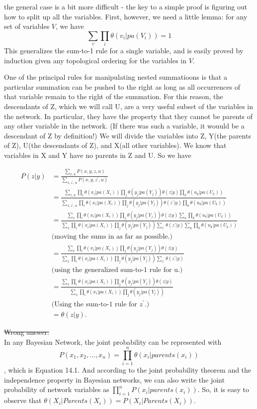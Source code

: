 \documentclass{article}
\begin{document}
\begin{enumerate}[a.]
{the general case is a bit more difficult - the key to a simple proof
is figuring out how to split up all the variables. First, however, we
need a little lemma: for any set of variables $V$, we have 
\[ \sum_v\prod_i\theta(v_i|pa(V_i))=1\]
This generalizes the sum-to-1 rule for a single variable, and is
easily proved by induction given any topological ordering for the
variables in $V$. 

One of the principal rules for manipulating nested summatioons is that
a particular summation can be pushed to the right as long as all
occurrences of that variable remain to the right of the summation. For
this reason, the descendants of Z, which we will call U, are a very
useful subset of the variables in the network. In particular, they
have the property that they cannot be parents of any other variable in
the network. (If there was such a variable, it wouuld be a descendant
of Z by definition!) We will divide the variables into Z, Y(the
parents of Z), U(the descendants of Z), and X(all other variables). We
know that variables in X and Y have no parents in Z and U. So we have 

\begin{align*}
  P(z|y) &= \frac{\sum_{x,u}P(x,y,z,u)}{\sum_{x,z^{\prime},u}P(x,y,z^{\prime},u)}\\
  &=\frac{\sum_{x,u}\prod_i\theta(x_i|pa(X_i))\prod_j\theta(y_j|pa(Y_j))\theta(z|y)\prod_k\theta(u_k|pa(U_k))}
  {\sum_{x,z^{\prime},u}\prod_i\theta(x_i|pa(X_i))\prod_j\theta(y_j|pa(Y_j))\theta(z^{\prime}|y)\prod_k\theta(u_k|pa(U_k))} \\
  &=\frac{\sum_{x}\prod_i\theta(x_i|pa(X_i))\prod_j\theta(y_j|pa(Y_j))\theta(z|y)\sum_u\prod_k\theta(u_k|pa(U_k))}
  {\sum_x\prod_i\theta(x_i|pa(X_i))\prod_j\theta(y_j|pa(Y_j))\sum_{z^{\prime}}\theta(z^{\prime}|y)\sum_u\prod_k\theta(u_k|pa(U_k))} \\
  & \mbox{(moving the sums in as far as possible.) } \\
  &=\frac{\sum_{x}\prod_i\theta(x_i|pa(X_i))\prod_j\theta(y_j|pa(Y_j))\theta(z|y)}
  {\sum_x\prod_i\theta(x_i|pa(X_i))\prod_j\theta(y_j|pa(Y_j))\sum_{z^{\prime}}\theta(z^{\prime}|y)} \\
  &\mbox{(using the generalized sum-to-1 rule for u.)}\\ 
  &= \frac{\sum_{x}\prod_i\theta(x_i|pa(X_i))\prod_j\theta(y_j|pa(Y_j))\theta(z|y)}
  {\sum_x\prod_i\theta(x_i|pa(X_i))\prod_j\theta(y_j|pa(Y_j))} \\
  & \mbox{(Using the sum-to-1 rule for } z^{\prime}.) \\
  &=\theta(z|y).
\end{align*}

\sout{Wrong answer: \\}
    In any Bayesian Network, the joint probability can be
    represented with \[ P(x_1,x_2,\ldots,x_n)=
    \prod_{i=1}^n\theta(x_i|parents(x_i)) \], which is Equation 14.1. 
    And according to the joint probability theorem and the
    independence property in Bayesian networks, we can also write the
    joint probability of network variables as
    $\prod_{i=1}^nP(x_i|parents(x_i))$.
    So, it is easy to observe that $\theta
    (X_i|Parents(X_i))=P(X_i|Parents(X_i))$. 
}
\end{enumerate}
\end{document}
